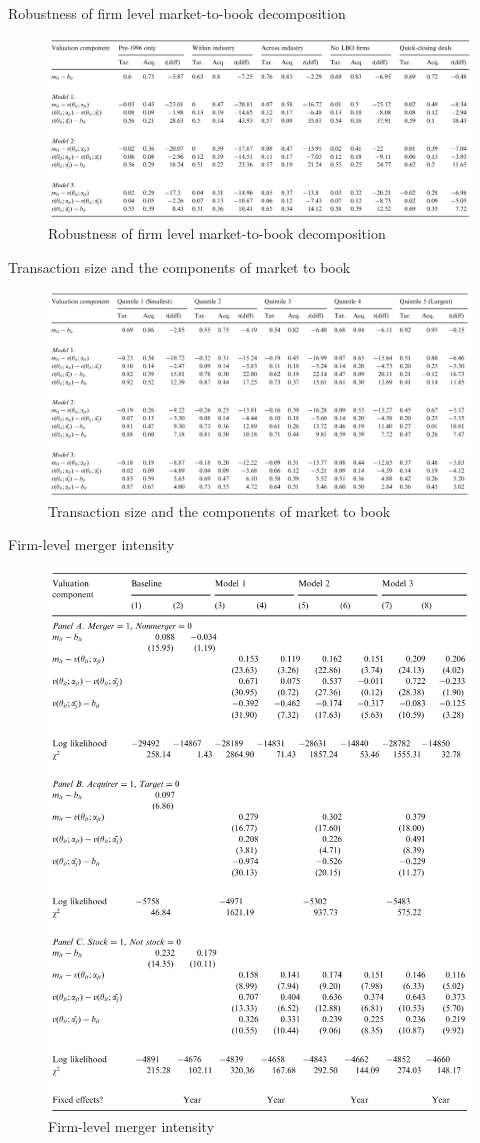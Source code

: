 \documentclass[aspectratio=169,xcolor=dvipsnames]{beamer}
\begin{document}
\begin{frame}{Robustness of firm level market-to-book decomposition}
    \begin{figure}
        \includegraphics[width=1\linewidth]{figures/p2_table7.png}
        \caption{Robustness of firm level market-to-book decomposition}
    \end{figure}
\end{frame}

\begin{frame}{Transaction size and the components of market to book}
    \begin{figure}
        \includegraphics[width=1\linewidth]{figures/p2_table8.png}
        \caption{Transaction size and the components of market to book}
    \end{figure}
\end{frame}

\begin{frame}{Firm-level merger intensity}
    \begin{figure}
        \includegraphics[width=0.4\linewidth]{figures/p2_table9.png}
        \caption{Firm-level merger intensity}
    \end{figure}
\end{frame}
\end{document}
